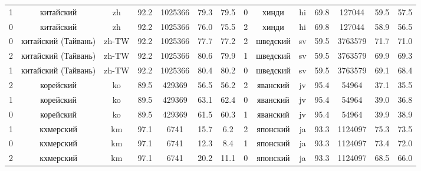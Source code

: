 \begin{table*}
{\begin{tabular}{|c|c|c|c|c|c|c|||c|c|c|c|c|c|c|}
1 & китайский & zh & 92.2 & 1025366 & 79.3 & 79.5 & 0 & хинди & hi & 69.8 & 127044 & 59.5 & 57.5\\
0 & китайский & zh & 92.2 & 1025366 & 76.0 & 75.5 & 2 & хинди & hi & 69.8 & 127044 & 58.9 & 56.5\\
0 & китайский (Тайвань) & zh-TW & 92.2 & 1025366 & 77.7 & 77.2 & 2 & шведский & sv & 59.5 & 3763579 & 71.7 & 71.0\\
2 & китайский (Тайвань) & zh-TW & 92.2 & 1025366 & 80.6 & 79.9 & 1 & шведский & sv & 59.5 & 3763579 & 69.9 & 69.3\\
1 & китайский (Тайвань) & zh-TW & 92.2 & 1025366 & 80.4 & 80.2 & 0 & шведский & sv & 59.5 & 3763579 & 69.1 & 68.4\\
2 & корейский & ko & 89.5 & 429369 & 56.5 & 56.2 & 2 & яванский & jv & 95.4 & 54964 & 37.1 & 35.5\\
1 & корейский & ko & 89.5 & 429369 & 63.1 & 62.4 & 0 & яванский & jv & 95.4 & 54964 & 39.0 & 36.8\\
0 & корейский & ko & 89.5 & 429369 & 61.5 & 60.3 & 1 & яванский & jv & 95.4 & 54964 & 39.9 & 38.9\\
1 & кхмерский & km & 97.1 & 6741 & 15.7 & 6.2 & 2 & японский & ja & 93.3 & 1124097 & 75.3 & 73.5\\
0 & кхмерский & km & 97.1 & 6741 & 12.3 & 8.4 & 1 & японский & ja & 93.3 & 1124097 & 73.4 & 72.0\\
2 & кхмерский & km & 97.1 & 6741 & 20.2 & 11.1 & 0 & японский & ja & 93.3 & 1124097 & 68.5 & 66.0\\ \hline
\end{tabular}
}
\end{table*}



